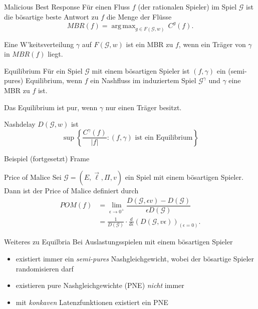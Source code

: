 \documentclass{beamer}
\DeclareMathOperator*{\argmax}{arg\,max}
\begin{document}
\begin{frame}{Malicious Best Response}
	Für einen Fluss $f$ (der rationalen Spieler) im Spiel $\mathcal G$ ist die \alert{bösartige beste Antwort} zu $f$ die Menge der Flüsse
	\[ MBR(f) = \argmax_{g \in F(\mathcal G, w)} \, C^g(f) .\]
	
	Eine W'keitsverteilung $\gamma$ auf $F(\mathcal G, w)$ ist ein MBR zu $f$, wenn ein Träger von $\gamma$ in $MBR(f)$ liegt.
\end{frame}

\begin{frame}{Equilibrium}
	Für ein Spiel $\mathcal G$ mit einem bösartigen Spieler ist $(f, \gamma)$ ein (semi-pures) \alert{Equilibrium}, wenn $f$ ein Nashfluss im induziertem Spiel $\mathcal G^\gamma$ und $\gamma$ eine MBR zu $f$ ist. 
	
	Das Equilibrium ist \alert{pur}, wenn $\gamma$ nur einen Träger besitzt.
	
	Nashdelay $D(\mathcal G, w)$ ist
	\[
		\sup \left\{\frac{C^\gamma(f)}{|f|} : (f,\gamma) \text{ ist ein Equilibrium} \right\}
	\]
\end{frame}

\begin{frame}{Beispiel (fortgesetzt)}
	Frame
\end{frame}

\begin{frame}{Price of Malice}
	Sei $\mathcal G = (E, \vec{\ell}, \Pi, v)$ ein Spiel mit einem bösartigen Spieler.
	Dann ist der \alert{Price of Malice} definiert durch
	\begin{align*}
		POM(f) &= \lim_{\epsilon \to 0^+} \dfrac{D(\mathcal G, \epsilon v) - D(\mathcal G)}{\epsilon D(\mathcal G)}  \\
		&= \frac{1}{D(\mathcal G)} \cdot \frac{d}{d \epsilon}(D(\mathcal G, v \epsilon))_{(\epsilon = 0)}.
	\end{align*}
\end{frame}

\begin{frame}{Weiteres zu Equilbria}
	Bei Auslastungsspielen mit einem bösartigen Spieler 
	\begin{itemize}
		\item existiert immer ein \emph{semi-pures} Nashgleichgewicht, wobei der bösartige Spieler randomisieren darf
		\item existieren pure Nashgleichgewichte (PNE) \emph{nicht} immer
		\item mit \emph{konkaven} Latenzfunktionen existiert ein PNE
	\end{itemize}
\end{frame}
\end{document}
